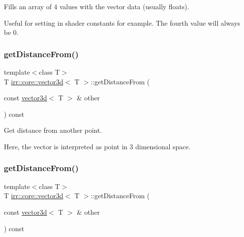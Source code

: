 Fills an array of 4 values with the vector data (usually floats). 

Useful for setting in shader constants for example. The fourth value will always be 0. \mbox{\label{classirr_1_1core_1_1vector3d_ab838ab8784f4e53453eb45223f624760}} 
\subsubsection{\texorpdfstring{get\+Distance\+From()}{getDistanceFrom()}\hspace{0.1cm}{\footnotesize\ttfamily [1/2]}}
{\footnotesize\ttfamily template$<$class T$>$ \\
T \hyperlink{classirr_1_1core_1_1vector3d}{irr\+::core\+::vector3d}$<$ T $>$\+::get\+Distance\+From (\begin{DoxyParamCaption}\item[{const \hyperlink{classirr_1_1core_1_1vector3d}{vector3d}$<$ T $>$ \&}]{other }\end{DoxyParamCaption}) const\hspace{0.3cm}{\ttfamily [inline]}}



Get distance from another point. 

Here, the vector is interpreted as point in 3 dimensional space. \mbox{\label{classirr_1_1core_1_1vector3d_ab838ab8784f4e53453eb45223f624760}} 
\subsubsection{\texorpdfstring{get\+Distance\+From()}{getDistanceFrom()}\hspace{0.1cm}{\footnotesize\ttfamily [2/2]}}
{\footnotesize\ttfamily template$<$class T$>$ \\
T \hyperlink{classirr_1_1core_1_1vector3d}{irr\+::core\+::vector3d}$<$ T $>$\+::get\+Distance\+From (\begin{DoxyParamCaption}\item[{const \hyperlink{classirr_1_1core_1_1vector3d}{vector3d}$<$ T $>$ \&}]{other }\end{DoxyParamCaption}) const\hspace{0.3cm}{\ttfamily [inline]}}



